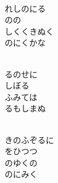 \documentclass[10pt,b5j]{tarticle} %
\begin{document}
\vspace{1.5em} %
\newcommand{\linespace}{0.5em} %
\newcommand{\blocksize}{0.5\hsize} %
\newcommand{\itemmargin}{3em} %
\begin{enumerate} %
    \setlength{\itemindent}{\itemmargin} %
    \begin{minipage}[c]{\blocksize}
    
        \vspace{\linespace}
        \item~\\
        れしのにる\\
        のの\\
        しくくきぬく\\
        のにくかな
        
    \end{minipage}
    \begin{minipage}[c]{\blocksize}
        
        \vspace{\linespace}
        \item~\\
        るのせに\\
        しぼる\\
        ふみては\\
        るもしまぬ
        
    \end{minipage}
    \begin{minipage}[c]{\blocksize}
        
        \vspace{\linespace}
        \item~\\
        きのふぞるに\\
        をひつつ\\
        のゆくの\\
        のにみく
        

\end{minipage}
\end{enumerate}
\end{document}
